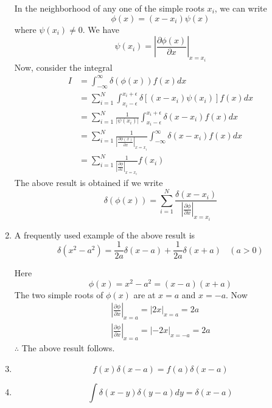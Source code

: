 \begin{enumerate}[label=\textbf{Property \ \arabic*},start=1]
			
			In the neighborhood of any one of the simple roots $x_i$, we can write
			\begin{equation}
				\phi(x) = (x - x_i) \psi(x)
			\end{equation}
			where $\psi(x_i) \neq 0$. We have
			\begin{equation}
				\psi(x_i) = \left|\frac{\partial \phi(x)}{\partial x} \right|_{x=x_i}
			\end{equation}
			Now, consider the integral
			\begin{eqnarray}
				I &= \int_{-\infty}^{\infty} \delta(\phi(x)) f(x) dx  \nonumber \\
				&= \sum_{i=1}^{N} \int_{x_i - \epsilon}^{x_i + \epsilon} \delta[(x-x_i) \psi(x_i)] f(x) dx \nonumber \\
				&= \sum_{i=1}^{N} \frac{1}{|\psi(x_i)|}\int_{x_i - \epsilon}^{x_i + \epsilon} \delta(x-x_i) f(x) dx \nonumber \\
				&= \sum_{i=1}^{N} \frac{1}{ \left|\frac{\partial \phi(x)}{\partial x} \right|_{x=x_i}}\int_{-\infty}^{\infty} \delta(x-x_i) f(x) dx \nonumber \\
				&= \sum_{i=1}^{N} \frac{1}{ \left|\frac{\partial \phi}{\partial x} \right|_{x=x_i}} f(x_i) \nonumber
			\end{eqnarray}
			The above result is obtained if we write
			\begin{equation}
				\delta(\phi(x)) = \sum_{i=1}^{N} \frac{\delta(x - x_i)}{\left|\frac{\partial \phi}{\partial x}\right|_{x=x_i}}
			\end{equation}
			
			
			\item
			A frequently used example of the above result is
			\begin{equation}
				\delta(x^2 - a^2) = \frac{1}{2 a} \delta(x - a) + \frac{1}{2 a} \delta(x + a) \ \ \ \ (a > 0)
			\end{equation}
			
			Here
			\begin{equation}
				\phi(x) = x^2 - a^2 = (x-a)(x+a)
			\end{equation}
				The two simple roots of $\phi(x)$ are at $x=a $ and $x=-a$. Now
				\begin{eqnarray}
					\left|\frac{\partial \phi}{\partial x}\right|_{x=a} = \left|2 x\right|_{x=a} = 2a  \\
					\left|\frac{\partial \phi}{\partial x}\right|_{x=a} = \left|-2 x\right|_{x=-a} = 2a 
				\end{eqnarray}
				$\therefore$ The above result follows.
				
				\item
				\begin{equation}
					f(x) \delta(x-a) = f(a) \delta(x-a)
				\end{equation}

				\item
				\begin{equation}
					\int \delta(x-y) \delta(y-a) dy = \delta(x-a)
				\end{equation}
				
			
		\end{enumerate}
		

